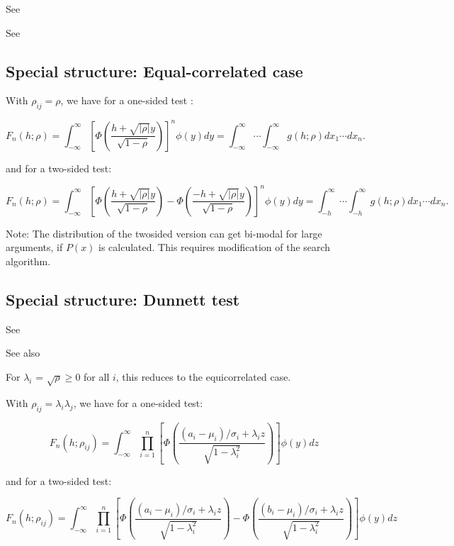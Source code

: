 See \cite{Stoline_1979}

See \cite{Narula_1978}



\subsection{Special structure: Equal-correlated case}
With $\rho_{ij}=\rho$, we have for a one-sided test \cite{Tong_1990}:

\begin{equation}
	F_n(h;\rho) = \int_{-\infty}^\infty \left[\Phi \left(\frac{h + \sqrt{\vert \rho \vert} y} {\sqrt{1-\rho}} \right) \right]^n \phi(y) dy =  \int_{-\infty}^\infty \cdots  \int_{-\infty}^\infty g(h;\rho) dx_1 \cdots dx_n.
\end{equation}

and for a two-sided test:

\begin{equation}
	F_n(h;\rho) = \int_{-\infty}^\infty \left[\Phi \left(\frac{h + \sqrt{\vert \rho \vert} y} {\sqrt{1-\rho}} \right) - \Phi \left(\frac{-h + \sqrt{\vert \rho \vert} y} {\sqrt{1-\rho}} \right) \right]^n \phi(y) dy =  \int_{-h}^\infty \cdots  \int_{-h}^\infty g(h;\rho) dx_1 \cdots dx_n.
\end{equation}


Note: The distribution of the twosided version can get bi-modal for large arguments, if $P(x)$ is calculated. This requires modification of the search algorithm.


\subsection{Special structure: Dunnett test}


See \cite{dunnett_multiple_1955}

See also \cite{Cheng_1995}

For $\lambda_i$ = $\sqrt{\rho} \geq 0$ for all $i$, this reduces to the equicorrelated case. 

With $\rho_{ij}=\lambda_i  \lambda_j$, we have for a one-sided test:

\begin{equation}
	F_n(h;\rho_{ij}) = \int_{-\infty}^\infty \prod_{i=1}^n  \left[\Phi \left(\frac{(a_i-\mu_i)/\sigma_i + \lambda_i z} {\sqrt{1-\lambda_i^2}} \right) \right] \phi(y) dz
\end{equation}

and for a two-sided test:

\begin{equation}
	F_n(h;\rho_{ij}) = \int_{-\infty}^\infty \prod_{i=1}^n  \left[\Phi \left(\frac{(a_i-\mu_i)/\sigma_i + \lambda_i z} {\sqrt{1-\lambda_i^2}} \right) - \Phi \left(\frac{(b_i-\mu_i)/\sigma_i + \lambda_i z} {\sqrt{1-\lambda_i^2}} \right) \right] \phi(y) dz
\end{equation}


